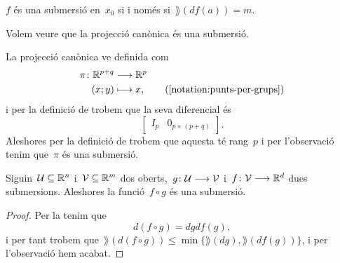 \documentclass[../../main.tex]{subfiles}
\begin{document}
    \begin{observation}
        \label{obs:submersio-si-i-nomes-si-te-rang-mes-petit-o-igual}
        \(f\) és una submersió en~\(x_{0}\) si i només si~\(\rang(df(a))=m\).
    \end{observation}
    \begin{example}
        \label{ex:la-projeccio-canonica-es-una-submersio}
        Volem veure que la projecció canònica és una submersió.
    \end{example}
    \begin{solution}
        La projecció canònica ve definida com
        \begin{align*}
            \pi\colon\mathbb{R}^{p+q}&\longrightarrow\mathbb{R}^{p} \\
            (x;y)&\longmapsto x, \tag{\ref{notation:punts-per-grups}}
        \end{align*}
        i per la definició de  trobem que la seva diferencial és
        \[\left[\begin{array}{c|c}
        I_{p} & 0_{p\times(p+q)}
        \end{array}\right].\]
        Aleshores per la definició de  trobem que aquesta té rang~\(p\) i per l'observació  tenim que~\(\pi\) és una submersió.
    \end{solution}
    \begin{proposition}
        \label{prop:la-composicio-de-submersions-es-submersio}
        Siguin~\(\mathcal{U}\subseteq\mathbb{R}^{n}\) i~\(\mathcal{V}\subseteq\mathbb{R}^{m}\) dos oberts,~\(g\colon\mathcal{U}\longrightarrow\mathcal{V}\) i~\(f\colon\mathcal{V}\longrightarrow\mathbb{R}^{d}\) dues submersions.
        Aleshores la funció~\(f\circ g\) és una submersió.
    \end{proposition}
    \begin{proof}
        Per la  tenim que
        \[
            d(f\circ g)=dgdf(g),
        \]
        i per tant trobem que~\(\rang(d(f\circ g))\leq\min\{\rang(dg),\rang(df(g))\}\), i per l'observació  hem acabat.
    \end{proof}
\end{document}
